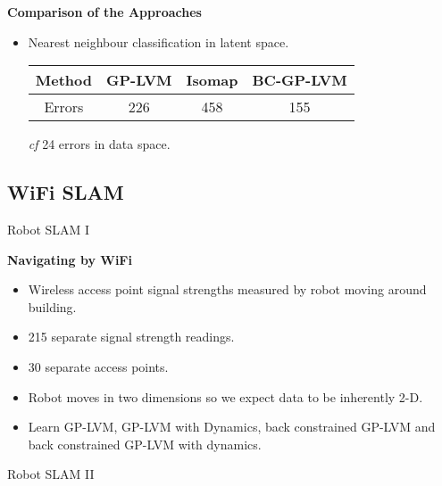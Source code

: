 \textbf{Comparison of the Approaches}
\begin{itemize}
\item Nearest neighbour classification in latent space.


\begin{center}
\begin{tabular}{|c|c|c|c|}
\hline 
Method & GP-LVM & Isomap & BC-GP-LVM\tabularnewline
\hline
Errors & 226 & 458 & 155 \tabularnewline
\hline
\end{tabular}
\par\end{center}

\begin{center}
\emph{cf} 24 errors in data space.
\par\end{center}

\end{itemize}
\begin{flushright}

\par\end{flushright}


\subsection{WiFi SLAM}

Robot SLAM I

\textbf{Navigating by WiFi}
\begin{itemize}
\item Wireless access point signal strengths measured by robot moving around
building.
\item 215 separate signal strength readings.
\item 30 separate access points.
\item Robot moves in two dimensions so we expect data to be inherently 2-D.
\item Learn GP-LVM, GP-LVM with Dynamics, back constrained GP-LVM and back
constrained GP-LVM with dynamics.\cite{Ferris:wifi07}
\end{itemize}
Robot SLAM II

%
\begin{figure}
\hfill{}\\
\hfill{}

\caption{ }

\end{figure}



